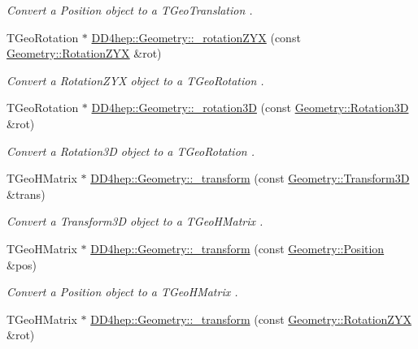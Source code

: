 \begin{DoxyCompactItemize}
\begin{DoxyCompactList}\small\item\em Convert a Position object to a T\+Geo\+Translation . \end{DoxyCompactList}\item 
T\+Geo\+Rotation $\ast$ \hyperlink{group___d_d4_h_e_p___g_e_o_m_e_t_r_y_gac468c0a81631e0a1c052094131f9d680}{D\+D4hep\+::\+Geometry\+::\+\_\+rotation\+Z\+YX} (const \hyperlink{namespace_d_d4hep_1_1_geometry_a24667b2b9c3cec3d5239828db4d52189}{Geometry\+::\+Rotation\+Z\+YX} \&rot)
\begin{DoxyCompactList}\small\item\em Convert a Rotation\+Z\+YX object to a T\+Geo\+Rotation . \end{DoxyCompactList}\item 
T\+Geo\+Rotation $\ast$ \hyperlink{group___d_d4_h_e_p___g_e_o_m_e_t_r_y_ga1dc4cc8b92d11d2fc874ed142c7b1bbc}{D\+D4hep\+::\+Geometry\+::\+\_\+rotation3D} (const \hyperlink{namespace_d_d4hep_1_1_geometry_a022fecb763315fa2bf39cbb648944a0e}{Geometry\+::\+Rotation3D} \&rot)
\begin{DoxyCompactList}\small\item\em Convert a Rotation3D object to a T\+Geo\+Rotation . \end{DoxyCompactList}\item 
T\+Geo\+H\+Matrix $\ast$ \hyperlink{group___d_d4_h_e_p___g_e_o_m_e_t_r_y_ga01d65a905944a17404358ea0116d4dd3}{D\+D4hep\+::\+Geometry\+::\+\_\+transform} (const \hyperlink{namespace_d_d4hep_1_1_geometry_aeb4c0356d12fd7be49a0aae50514e64b}{Geometry\+::\+Transform3D} \&trans)
\begin{DoxyCompactList}\small\item\em Convert a Transform3D object to a T\+Geo\+H\+Matrix . \end{DoxyCompactList}\item 
T\+Geo\+H\+Matrix $\ast$ \hyperlink{group___d_d4_h_e_p___g_e_o_m_e_t_r_y_ga543149f9fccc6961eb19ab307f96e192}{D\+D4hep\+::\+Geometry\+::\+\_\+transform} (const \hyperlink{namespace_d_d4hep_1_1_geometry_a55083902099d03506c6db01b80404900}{Geometry\+::\+Position} \&pos)
\begin{DoxyCompactList}\small\item\em Convert a Position object to a T\+Geo\+H\+Matrix . \end{DoxyCompactList}\item 
T\+Geo\+H\+Matrix $\ast$ \hyperlink{group___d_d4_h_e_p___g_e_o_m_e_t_r_y_gaf3a07560a5302fbb20eed5a933e611d8}{D\+D4hep\+::\+Geometry\+::\+\_\+transform} (const \hyperlink{namespace_d_d4hep_1_1_geometry_a24667b2b9c3cec3d5239828db4d52189}{Geometry\+::\+Rotation\+Z\+YX} \&rot)

\end{DoxyCompactItemize}
